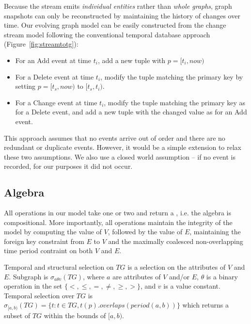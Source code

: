 Because the stream emits {\em individual entities} rather than {\em
  whole graphs}, graph snapshots can only be reconstructed by
maintaining the history of changes over time.  Our evolving graph
model can be easily constructed from the change stream model following
the conventional temporal database approach
(Figure~\ref{fig:streamtotg}):
\begin{itemize}[noitemsep,topsep=0pt]
\item For an Add event at time $t_i$, add a new tuple with $p=[t_i,
  now)$
\item For a Delete event at time $t_i$, modify the tuple matching the
  primary key by setting $p=[t_s, now)$ to $[t_s, t_i)$.
\item For a Change event at time $t_i$, modify the tuple matching the
  primary key as for a Delete event, and add a new tuple with the
  changed value as for an Add event.
\end{itemize}

This approach assumes that no events arrive out of order and there are
no redundant or duplicate events.  However, it would be a simple
extension to relax these two assumptions.  We also use a closed world
assumption -- if no event is recorded, for our purposes it did not
occur.

\subsection{Algebra}
\label{sec:model:algebra}

All operations in our model take one or two \tgs and return a \tg,
i.e. the algebra is compositional.  More importantly, all operations
maintain the integrity of the model by computing the value of $V$,
followed by the value of $E$, maintaining the foreign key constraint
from $E$ to $V$ and the maximally coalesced non-overlapping time
period contraint on both $V$ and $E$.

\begin{definition}[Selection]
Temporal and structural selection on $TG$ is a selection on the
attributes of $V$ and $E$.  Subgraph is $\sigma_{a \theta v}(TG)$,
where $a$ are attributes of $V$ and/or $E$, $\theta$ is a binary
operation in the set $\{<, \leq, =, \neq, \geq, >\}$, and $v$ is a
value constant.  Temporal selection over $TG$ is $\sigma_{[a,b)}(TG) =
  \{t: t \in TG, t(p).overlaps(period(a,b))\}$ which returns a subset
  of $TG$ within the bounds of $[a,b)$.
\label{def:selection}
\end{definition}

